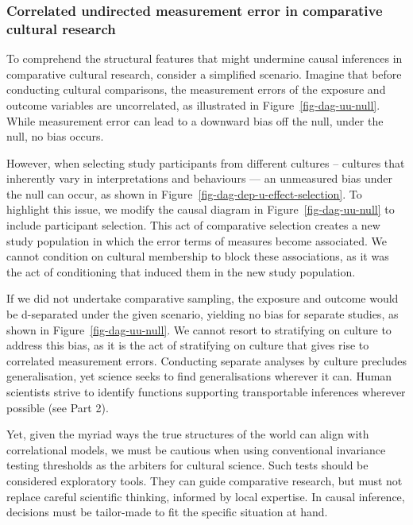 \documentclass[
  singlecolumn]{article}
\begin{document}
\hypertarget{correlated-undirected-measurement-error-in-comparative-cultural-research}{%
\subsubsection{Correlated undirected measurement error in comparative
cultural
research}\label{correlated-undirected-measurement-error-in-comparative-cultural-research}}

To comprehend the structural features that might undermine causal
inferences in comparative cultural research, consider a simplified
scenario. Imagine that before conducting cultural comparisons, the
measurement errors of the exposure and outcome variables are
uncorrelated, as illustrated in Figure~\ref{fig-dag-uu-null}. While
measurement error can lead to a downward bias off the null, under the
null, no bias occurs.

However, when selecting study participants from different cultures --
cultures that inherently vary in interpretations and behaviours --- an
unmeasured bias under the null can occur, as shown in
Figure~\ref{fig-dag-dep-u-effect-selection}. To highlight this issue, we
modify the causal diagram in Figure~\ref{fig-dag-uu-null} to include
participant selection. This act of comparative selection creates a new
study population in which the error terms of measures become associated.
We cannot condition on cultural membership to block these associations,
as it was the act of conditioning that induced them in the new study
population.

If we did not undertake comparative sampling, the exposure and outcome
would be d-separated under the given scenario, yielding no bias for
separate studies, as shown in Figure~\ref{fig-dag-uu-null}. We cannot
resort to stratifying on culture to address this bias, as it is the act
of stratifying on culture that gives rise to correlated measurement
errors. Conducting separate analyses by culture precludes
generalisation, yet science seeks to find generalisations wherever it
can. Human scientists strive to identify functions supporting
transportable inferences wherever possible (see Part 2).

Yet, given the myriad ways the true structures of the world can align
with correlational models, we must be cautious when using conventional
invariance testing thresholds as the arbiters for cultural science. Such
tests should be considered exploratory tools. They can guide comparative
research, but must not replace careful scientific thinking, informed by
local expertise. In causal inference, decisions must be tailor-made to
fit the specific situation at hand.
\end{document}
